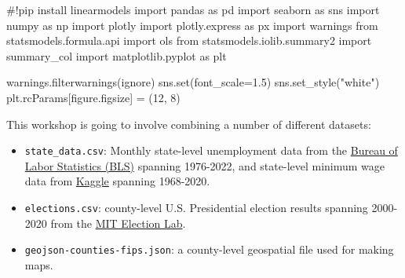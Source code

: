 \documentclass[
  letterpaper,
  DIV=11,
  numbers=noendperiod]{scrreprt}
\newenvironment{Shaded}{\begin{snugshade}}{\end{snugshade}}
\newcommand{\BuiltInTok}[1]{\textcolor[rgb]{0.00,0.23,0.31}{#1}}
\newcommand{\CommentTok}[1]{\textcolor[rgb]{0.37,0.37,0.37}{#1}}
\newcommand{\DecValTok}[1]{\textcolor[rgb]{0.68,0.00,0.00}{#1}}
\newcommand{\FloatTok}[1]{\textcolor[rgb]{0.68,0.00,0.00}{#1}}
\newcommand{\ImportTok}[1]{\textcolor[rgb]{0.00,0.46,0.62}{#1}}
\newcommand{\NormalTok}[1]{\textcolor[rgb]{0.00,0.23,0.31}{#1}}
\newcommand{\OperatorTok}[1]{\textcolor[rgb]{0.37,0.37,0.37}{#1}}
\newcommand{\StringTok}[1]{\textcolor[rgb]{0.13,0.47,0.30}{#1}}
\begin{document}
\begin{Shaded}
\begin{Highlighting}[]
\CommentTok{\#!pip install linearmodels}
\ImportTok{import}\NormalTok{ pandas }\ImportTok{as}\NormalTok{ pd}
\ImportTok{import}\NormalTok{ seaborn }\ImportTok{as}\NormalTok{ sns}
\ImportTok{import}\NormalTok{ numpy }\ImportTok{as}\NormalTok{ np}
\ImportTok{import}\NormalTok{ plotly}
\ImportTok{import}\NormalTok{ plotly.express }\ImportTok{as}\NormalTok{ px}
\ImportTok{import}\NormalTok{ warnings}
\ImportTok{from}\NormalTok{ statsmodels.formula.api }\ImportTok{import}\NormalTok{ ols}
\ImportTok{from}\NormalTok{ statsmodels.iolib.summary2 }\ImportTok{import}\NormalTok{ summary\_col}
\ImportTok{import}\NormalTok{ matplotlib.pyplot }\ImportTok{as}\NormalTok{ plt}

\NormalTok{warnings.filterwarnings(}\StringTok{\textquotesingle{}ignore\textquotesingle{}}\NormalTok{)}
\NormalTok{sns.}\BuiltInTok{set}\NormalTok{(font\_scale}\OperatorTok{=}\FloatTok{1.5}\NormalTok{)}
\NormalTok{sns.set\_style(}\StringTok{"white"}\NormalTok{)}
\NormalTok{plt.rcParams[}\StringTok{\textquotesingle{}figure.figsize\textquotesingle{}}\NormalTok{] }\OperatorTok{=}\NormalTok{ (}\DecValTok{12}\NormalTok{, }\DecValTok{8}\NormalTok{)}
\end{Highlighting}
\end{Shaded}

This workshop is going to involve combining a number of different
datasets:

\begin{itemize}
\item
  \texttt{state\_data.csv}: Monthly state-level unemployment data from
  the \href{www.bls.gov}{Bureau of Labor Statistics (BLS)} spanning
  1976-2022, and state-level minimum wage data from
  \href{https://www.kaggle.com/datasets/lislejoem/us-minimum-wage-by-state-from-1968-to-2017}{Kaggle}
  spanning 1968-2020.
\item
  \texttt{elections.csv}: county-level U.S. Presidential election
  results spanning 2000-2020 from the
  \href{https://electionlab.mit.edu/data}{MIT Election Lab}.
\item
  \texttt{geojson-counties-fips.json}: a county-level geospatial file
  used for making maps.
\end{itemize}
\end{document}
